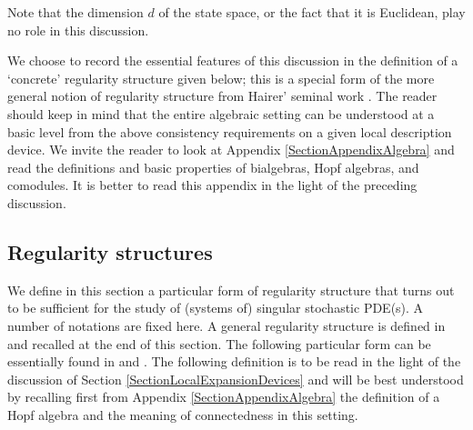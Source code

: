 \documentclass[10pt, reqno]{amsart}
\numberwithin{subsection}{section}
\numberwithin{subsubsection}{subsection}
\numberwithin{equation}{section} %
\theoremstyle{mystyle}
\theoremstyle{mystyle2}
\theoremstyle{mystyle3}
\newcommand{\ssk}{\smallskip}
\begin{document}
Note that the dimension $d$ of the state space, or the fact that it is Euclidean, play no role in this discussion.

\ssk

We choose to record the essential features of this discussion in the definition of a `concrete' regularity structure given below; this is a special form of the more general notion of regularity structure from Hairer' seminal work \cite{Hai14}. The reader should keep in mind that the entire algebraic setting can be understood at a basic level from the above consistency requirements on a given local description device. We invite the reader to look at Appendix {\sf \ref{SectionAppendixAlgebra}} and read the definitions and basic properties of bialgebras, Hopf algebras, and comodules. It is better to read this appendix in the light of the preceding discussion.



\bigskip

\subsection{Regularity structures}
\label{SectionConcreteRS}

We define in this section a particular form of regularity structure that turns out to be sufficient for the study of (systems of) singular stochastic PDE(s). A number of notations are fixed here. A general regularity structure is defined in \cite[Section 2]{Hai14} and recalled at the end of this section. The following particular form can be essentially found in \cite[Section 8]{Hai14} and \cite{BHZ}. The following definition is to be read in the light of the discussion of Section \ref{SectionLocalExpansionDevices} and will be best understood by recalling first from Appendix {\sf \ref{SectionAppendixAlgebra}} the definition of a Hopf algebra and the meaning of connectedness in this setting.

\medskip
\end{document}
